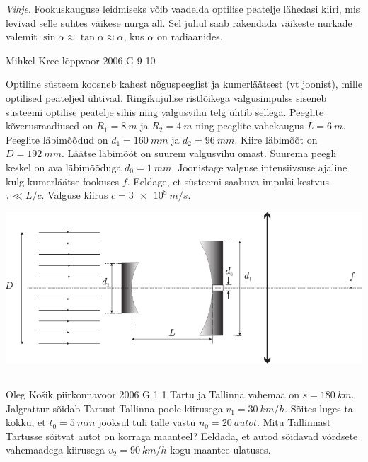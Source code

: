 \documentclass[11pt]{article}
\begin{document}
{{\emph{Vihje}. Fookuskauguse leidmiseks võib vaadelda optilise peatelje lähedasi kiiri, mis levivad
selle suhtes väikese nurga all. Sel juhul saab rakendada väikeste nurkade valemit $\sin \alpha \approx \tan \alpha \approx \alpha$, kus $\alpha$ on radiaanides. 
\fi
}

{Mihkel Kree} %
{lõppvoor} %
{2006} %
{G 9} %
{10} %
{
\ifStatement
Optiline süsteem koosneb kahest nõguspeeglist ja kumerläätsest (vt joonist), mille optilised peateljed ühtivad. Ringikujulise ristlõikega valgusimpulss siseneb süsteemi optilise peatelje sihis ning valgusvihu telg ühtib sellega. Peeglite kõverusraadiused on $R_1 = \SI{8}{m}$ ja $R_2 = \SI{4}{m}$ ning peeglite vahekaugus $L = \SI{6}{m}$. Peeglite läbimõõdud on $d_1 = \SI{160}{mm}$ ja $d_2 = \SI{96}{mm}$. Kiire läbimõõt on $D = \SI{192}{mm}$. Läätse läbimõõt on suurem valgusvihu omast. Suurema peegli keskel on ava läbimõõduga $d_0 = \SI{1}{mm}$. Joonistage valguse intensiivsuse ajaline kulg kumerläätse fookuses $f$. Eeldage, et süsteemi saabuva impulsi kestvus $\tau \ll L/c$. Valguse kiirus $c = \SI{3e8}{m/s}$.

\begin{center}
	\includegraphics[width=0.95\linewidth]{2006-v3g-09-yl}
\end{center}
\fi
}
\newpage\subsection{\protect{}}

{Oleg Košik} %
{piirkonnavoor} %
{2006} %
{G 1} %
{1} %
{
\ifStatement
Tartu ja Tallinna vahemaa on $s = \SI{180}{km}$. Jalgrattur sõidab Tartust Tallinna poole kiirusega $v_1 = \SI{30}{km/h}$. Sõites luges ta kokku, et $t_0 = \SI{5}{min}$ jooksul tuli talle vastu $n_0 = \SI{20}{autot}$. Mitu Tallinnast Tartusse sõitvat autot on korraga maanteel? Eeldada, et autod sõidavad võrdsete vahemaadega kiirusega $v_2 = \SI{90}{km/h}$ kogu maantee ulatuses.
\fi
}

}
\end{document}
